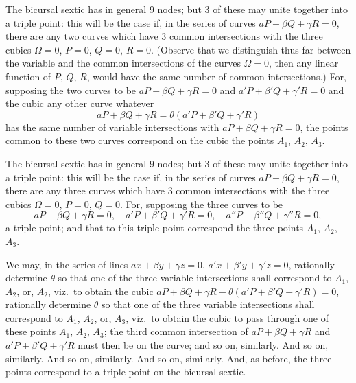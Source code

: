\documentclass[11pt,a4paper]{book}
\begin{document}
The bicursal sextic has in general $9$ nodes; but $3$ of these may unite together into a triple point: this will be the case if, in the series of curves $aP + \beta Q + \gamma R = 0$, there are any two curves which have $3$ common intersections with the three cubics $\Omega = 0$, $P = 0$, $Q = 0$, $R = 0$. (Observe that we distinguish thus far between the variable and the common intersections of the curves $\Omega = 0$, then any linear function of $P$, $Q$, $R$, would have the same number of common intersections.) For, supposing the two curves to be $aP + \beta Q + \gamma R = 0$ and $a'P + \beta'Q + \gamma'R = 0$ and the cubic any other curve whatever
\[
aP + \beta Q + \gamma R = \theta(a'P + \beta'Q + \gamma'R)
\]
has the same number of variable intersections with $aP + \beta Q + \gamma R = 0$, the points common to these two curves correspond on the cubic the points $A_1$, $A_2$, $A_3$.

The bicursal sextic has in general $9$ nodes; but $3$ of these may unite together into a triple point: this will be the case if, in the series of curves $aP + \beta Q + \gamma R = 0$, there are any three curves which have $3$ common intersections with the three cubics $\Omega = 0$, $P = 0$, $Q = 0$. For, supposing the three curves to be
\[
aP + \beta Q + \gamma R = 0, \quad a'P + \beta'Q + \gamma'R = 0, \quad a''P + \beta''Q + \gamma''R = 0,
\]
a triple point; and that to this triple point correspond the three points $A_1$, $A_2$, $A_3$.

We may, in the series of lines $ax + \beta y + \gamma z = 0$, $a'x + \beta'y + \gamma'z = 0$, rationally determine $\theta$ so that one of the three variable intersections shall correspond to $A_1$, $A_2$, or, $A_2$, viz.\ to obtain the cubic $aP + \beta Q + \gamma R - \theta(a'P + \beta'Q + \gamma'R) = 0$, rationally determine $\theta$ so that one of the three variable intersections shall correspond to $A_1$, $A_2$, or, $A_3$, viz.\ to obtain the cubic to pass through one of these points $A_1$, $A_2$, $A_3$; the third common intersection of $aP + \beta Q + \gamma R$ and $a'P + \beta'Q + \gamma'R$ must then be on the curve; and so on, similarly. And so on, similarly. And so on, similarly. And so on, similarly. And, as before, the three points correspond to a triple point on the bicursal sextic.

\bigskip
\end{document}
